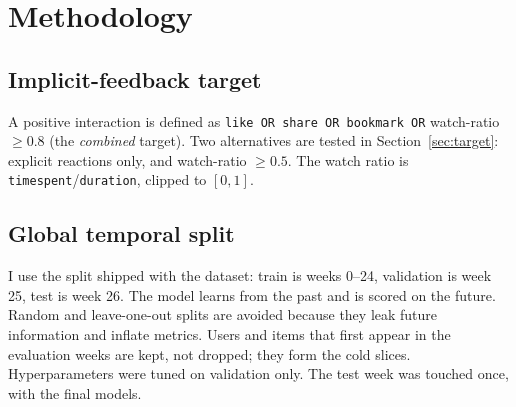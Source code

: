 \documentclass[11pt,a4paper]{article}
\begin{document}
\section{Methodology}
\subsection{Implicit-feedback target}
A positive interaction is defined as \texttt{like OR share OR bookmark OR}
watch-ratio $\geq 0.8$ (the \emph{combined} target). Two alternatives are tested in
Section~\ref{sec:target}: explicit reactions only, and watch-ratio $\geq 0.5$. The watch
ratio is \texttt{timespent}/\texttt{duration}, clipped to $[0,1]$.

\subsection{Global temporal split}
I use the split shipped with the dataset: train is weeks 0--24, validation is week 25,
test is week 26. The model learns from the past and is scored on the future. Random and
leave-one-out splits are avoided because they leak future information and inflate
metrics. Users and items that first appear in the evaluation weeks are kept, not dropped;
they form the cold slices. Hyperparameters were tuned on validation only. The test week
was touched once, with the final models.
\end{document}
